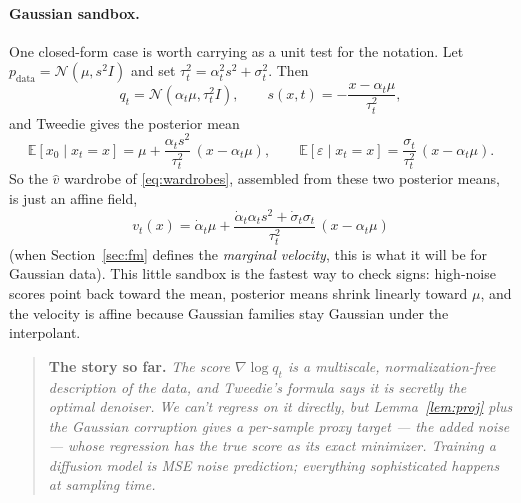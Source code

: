 \documentclass[10pt,a4paper]{article}
\newenvironment{recap}
{\par\medskip\noindent\begin{quote}\small\textbf{The story so far.}\itshape\;}
{\end{quote}\medskip}
\newcommand{\E}{\mathbb{E}}
\newcommand{\score}{s}
\newcommand{\veps}{\varepsilon}
\begin{document}
\paragraph{Gaussian sandbox.}
One closed-form case is worth carrying as a unit test for the notation.
Let $p_{\mathrm{data}} = \mathcal{N}(\mu, s^2 I)$ and set
$\tau_t^2 = \alpha_t^2 s^2 + \sigma_t^2$. Then
\begin{equation}
q_t = \mathcal{N}(\alpha_t \mu, \tau_t^2 I),
\qquad
\score(x,t) = -\frac{x - \alpha_t \mu}{\tau_t^2},
\label{eq:gauss-score}
\end{equation}
and Tweedie gives the posterior mean
\begin{equation}
\E[x_0 \mid x_t = x]
= \mu + \frac{\alpha_t s^2}{\tau_t^2}\,(x - \alpha_t \mu),
\qquad
\E[\veps \mid x_t = x]
= \frac{\sigma_t}{\tau_t^2}\,(x - \alpha_t \mu).
\label{eq:gauss-post}
\end{equation}
So the $\hat v$ wardrobe of \eqref{eq:wardrobes}, assembled from these
two posterior means, is just an affine field,
\begin{equation}
v_t(x)
= \dot\alpha_t \mu
+ \frac{\dot\alpha_t \alpha_t s^2 + \dot\sigma_t \sigma_t}{\tau_t^2}\,
(x - \alpha_t \mu)
\label{eq:gauss-vel}
\end{equation}
(when Section~\ref{sec:fm} defines the \emph{marginal velocity}, this is
what it will be for Gaussian data).
This little sandbox is the fastest way to check signs: high-noise scores
point back toward the mean, posterior means shrink linearly toward $\mu$,
and the velocity is affine because Gaussian families stay Gaussian under
the interpolant.

\begin{recap}
The score $\nabla\log q_t$ is a multiscale, normalization-free description
of the data, and Tweedie's formula says it is secretly the optimal
denoiser. We can't regress on it directly, but
Lemma~\ref{lem:proj} plus the Gaussian corruption gives a per-sample
proxy target --- the added noise --- whose regression has the true score as
its exact minimizer. Training a diffusion model is MSE noise prediction;
everything sophisticated happens at sampling time.
\end{recap}
\end{document}
